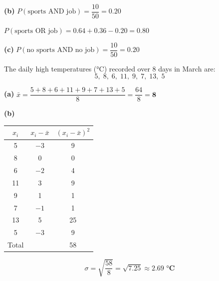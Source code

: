 \documentclass[addpoints]{exam}
\begin{document}
\begin{questions}
\begin{solution}[8cm]
\textbf{(b)} $P(\text{sports AND job}) = \dfrac{10}{50} = \mathbf{0.20}$

$P(\text{sports OR job}) = 0.64 + 0.36 - 0.20 = \mathbf{0.80}$

\textbf{(c)} $P(\text{no sports AND no job}) = \dfrac{10}{50} = \mathbf{0.20}$
\end{solution}

\question[8] The daily high temperatures (°C) recorded over 8 days in March are:
\[5,\; 8,\; 6,\; 11,\; 9,\; 7,\; 13,\; 5\]
\begin{solution}[11cm]
\textbf{(a)} $\bar{x} = \dfrac{5+8+6+11+9+7+13+5}{8} = \dfrac{64}{8} = \mathbf{8}$

\textbf{(b)}
\begin{center}
\begin{tabular}{@{}ccc@{}}
\toprule
$x_i$ & $x_i - \bar{x}$ & $(x_i - \bar{x})^2$ \\
\midrule
5 & $-3$ & 9 \\
8 & 0 & 0 \\
6 & $-2$ & 4 \\
11 & 3 & 9 \\
9 & 1 & 1 \\
7 & $-1$ & 1 \\
13 & 5 & 25 \\
5 & $-3$ & 9 \\
\midrule
Total & & 58 \\
\bottomrule
\end{tabular}
\end{center}
\[\sigma = \sqrt{\dfrac{58}{8}} = \sqrt{7.25} \approx \mathbf{2.69 \text{ °C}}\]


\end{solution}
\end{questions}
\end{document}
